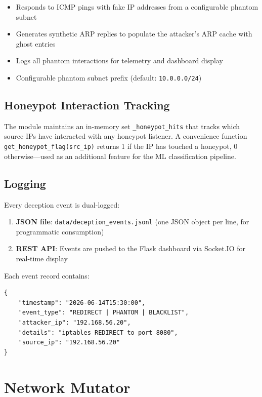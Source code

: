 \documentclass[12pt,a4paper]{article}
\begin{document}
\begin{itemize}[leftmargin=*, itemsep=3pt]
    \item Responds to ICMP pings with fake IP addresses from a configurable phantom subnet
    \item Generates synthetic ARP replies to populate the attacker's ARP cache with ghost entries
    \item Logs all phantom interactions for telemetry and dashboard display
    \item Configurable phantom subnet prefix (default: \texttt{10.0.0.0/24})
\end{itemize}

\subsection{Honeypot Interaction Tracking}

The module maintains an in-memory set \texttt{\_honeypot\_hits} that tracks which source IPs have interacted with any honeypot listener. A convenience function \texttt{get\_honeypot\_flag(src\_ip)} returns 1 if the IP has touched a honeypot, 0 otherwise---used as an additional feature for the ML classification pipeline.

\subsection{Logging}

Every deception event is dual-logged:

\begin{enumerate}[leftmargin=*, itemsep=3pt]
    \item \textbf{JSON file}: \texttt{data/deception\_events.jsonl} (one JSON object per line, for programmatic consumption)
    \item \textbf{REST API}: Events are pushed to the Flask dashboard via Socket.IO for real-time display
\end{enumerate}

Each event record contains:
\begin{lstlisting}[style=python, caption={Deception event record schema}]
{
    "timestamp": "2026-06-14T15:30:00",
    "event_type": "REDIRECT | PHANTOM | BLACKLIST",
    "attacker_ip": "192.168.56.20",
    "details": "iptables REDIRECT to port 8080",
    "source_ip": "192.168.56.20"
}
\end{lstlisting}

\section{Network Mutator}
\label{sec:mutator}
\end{document}
